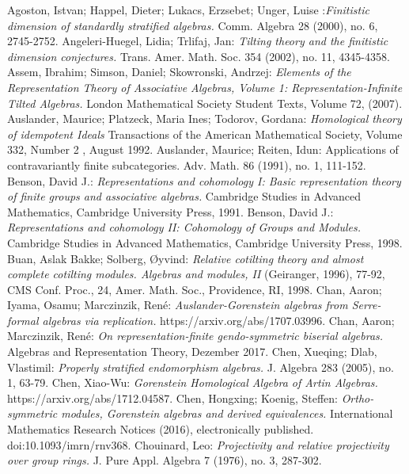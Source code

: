 \documentclass[a4paper]{amsart}
\theoremstyle{definition}
\theoremstyle{remark}
\numberwithin{equation}{theorem}
\begin{document}
\begin{thebibliography}{Gus}
 Agoston, Istvan; Happel, Dieter; Lukacs, Erzsebet; Unger, Luise :{\it Finitistic dimension of standardly stratified algebras.} Comm. Algebra 28 (2000), no. 6, 2745-2752.
 Angeleri-Huegel, Lidia; Trlifaj, Jan: {\it
Tilting theory and the finitistic dimension conjectures. } 
Trans. Amer. Math. Soc. 354 (2002), no. 11, 4345-4358. 
 Assem, Ibrahim; Simson, Daniel; Skowronski, Andrzej: {\it Elements of the Representation Theory of Associative Algebras, Volume 1: Representation-Infinite Tilted Algebras.}
\noindent London Mathematical Society Student Texts, Volume 72, (2007). 
 Auslander, Maurice; Platzeck, Maria Ines; Todorov, Gordana: {\it Homological theory of idempotent Ideals} Transactions of the American Mathematical Society, Volume 332, Number 2 , August 1992.
 Auslander, Maurice; Reiten, Idun: {Applications of contravariantly finite subcategories. } Adv. Math. 86 (1991), no. 1, 111-152. 
 Benson, David J.: {\it Representations and cohomology I: Basic representation theory of finite groups and associative algebras.} Cambridge Studies in Advanced Mathematics, Cambridge University Press, 1991.
 Benson, David J.: {\it Representations and cohomology II: Cohomology of Groups and Modules.} Cambridge Studies in Advanced Mathematics, Cambridge University Press, 1998.
 Buan, Aslak Bakke; Solberg, {{\O}}yvind: {\it Relative cotilting theory and almost complete cotilting modules. Algebras and modules, II} (Geiranger, 1996), 77-92, CMS Conf. Proc., 24, Amer. Math. Soc., Providence, RI, 1998.
 Chan, Aaron; Iyama, Osamu; Marczinzik, Ren\'e: {\it Auslander-Gorenstein algebras from Serre-formal algebras via replication.} https://arxiv.org/abs/1707.03996.
 Chan, Aaron; Marczinzik, Ren\'e: {\it On representation-finite gendo-symmetric biserial algebras.} Algebras and Representation Theory, Dezember 2017.
 Chen, Xueqing; Dlab, Vlastimil: {\it Properly stratified endomorphism algebras.} J. Algebra 283 (2005), no. 1, 63-79. 
 Chen, Xiao-Wu: {\it Gorenstein Homological Algebra of Artin
Algebras.} https://arxiv.org/abs/1712.04587.
 Chen, Hongxing; Koenig, Steffen: {\it Ortho-symmetric modules, Gorenstein algebras and derived equivalences.} International Mathematics Research Notices (2016), electronically published. doi:10.1093/imrn/rnv368.
 Chouinard, Leo: {\it Projectivity and relative projectivity over group rings.} J. Pure Appl. Algebra 7 (1976), no. 3, 287-302. 

\end{thebibliography}
\end{document}

